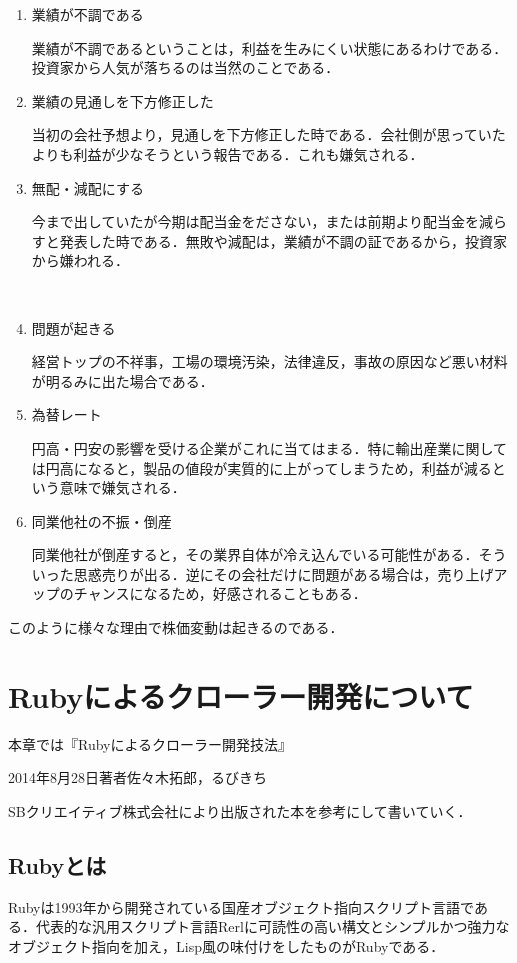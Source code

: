 \begin{enumerate}
  \item 業績が不調である

業績が不調であるということは，利益を生みにくい状態にあるわけである．投資家から人気が落ちるのは当然のことである．



  \item 業績の見通しを下方修正した

当初の会社予想より，見通しを下方修正した時である．会社側が思っていたよりも利益が少なそうという報告である．これも嫌気される．
　
  \item 無配・減配にする

今まで出していたが今期は配当金をださない，または前期より配当金を減らすと発表した時である．無敗や減配は，業績が不調の証であるから，投資家から嫌われる．

　
  \item 問題が起きる

経営トップの不祥事，工場の環境汚染，法律違反，事故の原因など悪い材料が明るみに出た場合である．
　
  \item 為替レート

円高・円安の影響を受ける企業がこれに当てはまる．特に輸出産業に関しては円高になると，製品の値段が実質的に上がってしまうため，利益が減るという意味で嫌気される．

  \item 同業他社の不振・倒産

同業他社が倒産すると，その業界自体が冷え込んでいる可能性がある．そういった思惑売りが出る．逆にその会社だけに問題がある場合は，売り上げアップのチャンスになるため，好感されることもある\cite{kabudown}．
\end{enumerate}

このように様々な理由で株価変動は起きるのである．







\chapter{Rubyによるクローラー開発について}
本章では『Rubyによるクローラー開発技法』

2014年8月28日著者佐々木拓郎，るびきち

SBクリエイティブ株式会社により出版された本を参考にして書いていく．


\section{Rubyとは}
Rubyは1993年から開発されている国産オブジェクト指向スクリプト言語である．代表的な汎用スクリプト言語Rerlに可読性の高い構文とシンプルかつ強力なオブジェクト指向を加え，Lisp風の味付けをしたものがRubyである\cite{miyake}．

